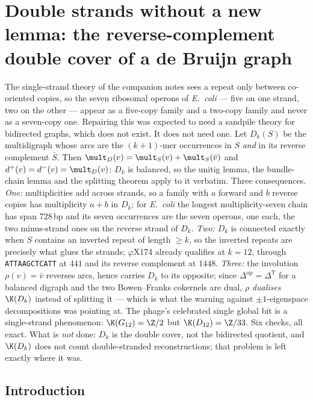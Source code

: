 \chapter{Double strands without a new lemma: the reverse-complement double cover of a de Bruijn graph}\label{chap:Bio6}
\begin{chapterabstract}
\noindent
The single-strand theory of the companion notes sees a repeat only between co-oriented
copies, so the seven ribosomal operons of \emph{E.\ coli} --- five on one strand, two on
the other --- appear as a five-copy family and a two-copy family and never as a
seven-copy one. Repairing this was expected to need a sandpile theory for bidirected
graphs, which does not exist. It does not need one. Let $D_k(S)$ be the multidigraph
whose arcs are the $(k{+}1)$-mer occurrences in $S$ \emph{and} in its reverse complement
$\bar S$. Then $\mult_D(v)=\mult_S(v)+\mult_S(\bar v)$ and
$d^{+}(v)=d^{-}(v)=\mult_D(v)$: $D_k$ is balanced, so the unitig lemma, the bundle-chain
lemma and the splitting theorem apply to it verbatim. Three consequences. \emph{One:}
multiplicities add across strands, so a family with $a$ forward and $b$ reverse copies has
multiplicity $a+b$ in $D_k$; for \emph{E.\ coli} the longest multiplicity-seven chain has
span $728$\,bp and its seven occurrences are the seven operons, one each, the two
minus-strand ones on the reverse strand of $D_k$. \emph{Two:} $D_k$ is connected exactly
when $S$ contains an inverted repeat of length $\ge k$, so the inverted repeats are
precisely what glues the strands; $\varphi$X174 already qualifies at $k=12$, through
\texttt{ATTAAGCTCATT} at $441$ and its reverse complement at $1448$. \emph{Three:} the
involution $\rho(v)=\bar v$ reverses arcs, hence carries $D_k$ to its opposite; since
$\Delta^{\mathrm{op}}=\Delta^{\mathsf T}$ for a balanced digraph and the two Bowen--Franks
cokernels are dual, $\rho$ \emph{dualises} $\K(D_k)$ instead of splitting it --- which is
what the warning against $\pm1$-eigenspace decompositions was pointing at. The phage's
celebrated single global bit is a single-strand phenomenon: $\K(G_{12})=\Z/2$ but
$\K(D_{12})=\Z/33$. Six checks, all exact. What is \emph{not} done: $D_k$ is the double
cover, not the bidirected quotient, and $\K(D_k)$ does not count double-stranded
reconstructions; that problem is left exactly where it was.
\end{chapterabstract}

\section{Introduction}\label{Bio6:sec:intro}

